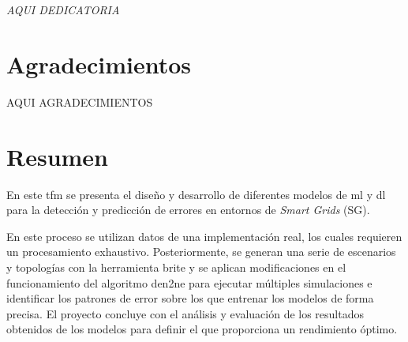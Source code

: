 

\cleardoublepage %
\chapter*{}
\setlength{\leftmargin}{0.5\textwidth}
\setlength{\parsep}{0cm}
\addtolength{\topsep}{0.5cm}
\begin{flushright}
	\small\em{
		AQUI DEDICATORIA
	}
\end{flushright}

 


\chapter*{Agradecimientos}

\thispagestyle{empty}
\vspace{1cm}

AQUI AGRADECIMIENTOS

\cleardoublepage %



\chapter{Resumen}
\thispagestyle{empty}
En este \gls{tfm} se presenta el diseño y desarrollo de diferentes modelos de \gls{ml} y \gls{dl} para la detección y predicción de errores en entornos de \textit{Smart Grids} (SG). 

\vspace{3mm}

En este proceso se utilizan datos de una implementación real, los cuales requieren un procesamiento exhaustivo. Posteriormente, se generan una serie de escenarios y topologías con la herramienta \acrshort{brite} y se aplican modificaciones en el funcionamiento del algoritmo \acrshort{den2ne} para ejecutar múltiples simulaciones e identificar los patrones de error sobre los que entrenar los modelos de forma precisa. El proyecto concluye con el análisis y evaluación de los resultados obtenidos de los modelos para definir el que proporciona un rendimiento óptimo.

